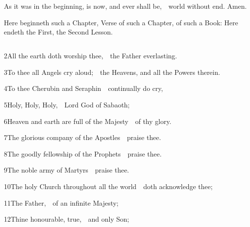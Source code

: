 As it was in the beginning, is now, and ever shall be,\ \star\ world without end. Amen.

\bigskip
{}

Here beginneth such a Chapter,  Verse of such a Chapter, of such a Book:  Here endeth the First,  the Second Lesson.

\medskip


\subsection{}

2\enspace All the earth doth worship thee,\ \star\ the Father everlasting.

3\enspace To thee all Angels cry aloud;\ \star\ the Heavens, and all the Powers therein.

4\enspace To thee Cherubin and Seraphin\ \star\ continually do cry,

5\enspace Holy, Holy, Holy,\ \star\ Lord God of Sabaoth;

6\enspace Heaven and earth are full of the Majesty\ \star\ of thy glory.

7\enspace The glorious company of the Apostles\ \star\ praise thee.

8\enspace The goodly fellowship of the Prophets\ \star\ praise thee.

9\enspace The noble army of Martyrs\ \star\ praise thee.

10\enspace The holy Church throughout all the world\ \star\ doth acknowledge thee;

11\enspace The Father,\ \star\ of an infinite Majesty;

12\enspace Thine honourable, true,\ \star\ and only Son;

